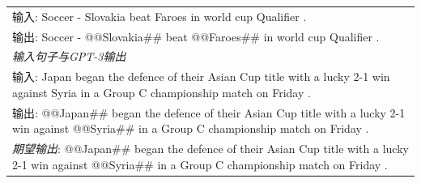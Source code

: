 \documentclass[supercite]{Experimental_Report}
\theoremstyle{definition}
\begin{document}
\begin{table}[th!]
{\begin{tabular}{l}
输入: Soccer - Slovakia beat Faroes in world cup Qualifier . \\
输出: Soccer - @@Slovakia\#\# beat @@Faroes\#\# in world cup Qualifier . \\\midrule
\textit{输入句子与GPT-3输出} \\
输入: Japan began the defence of their Asian Cup title with a lucky 2-1 win against Syria in a Group C championship match on Friday . \\
输出: @@Japan\#\# began the defence of their Asian Cup title with a lucky 2-1 win against @@Syria\#\# in a Group C championship match on Friday .\\
{\color{blue}\it 期望输出}: @@Japan\#\# began the defence of their Asian Cup title with a lucky 2-1 win against @@Syria\#\# in a Group C championship match on Friday . \\\bottomrule


\end{tabular}}
\end{table}
\end{document}
